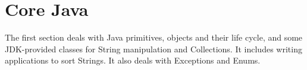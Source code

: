 \section{Core Java}

The first section deals with Java primitives, objects and their life cycle, and some JDK-provided classes for String manipulation and Collections. It includes writing applications to sort Strings. It also deals with Exceptions and Enums.









